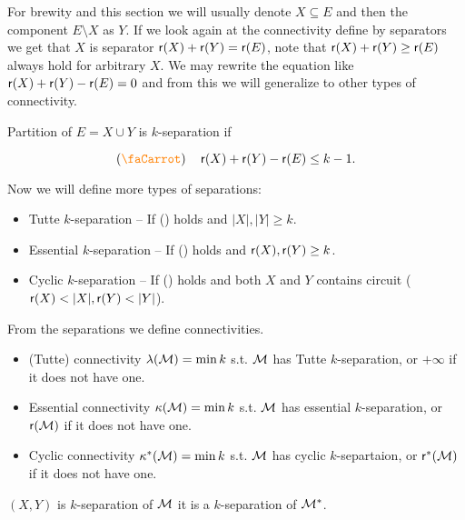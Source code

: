For brewity and this section we will usually denote $X \subseteq E$ and then the component $E \setminus X$ as $Y$. If we look again at the connectivity define by separators we get that $X$ is separator \ifft $\operatorname{\mathsf{r}}(X) + \operatorname{\mathsf{r}}(Y) = \operatorname{\mathsf{r}}(E)$, note that $\operatorname{\mathsf{r}}(X) + \operatorname{\mathsf{r}}(Y) \geq \operatorname{\mathsf{r}}(E)$ always hold for arbitrary $X$. We may rewrite the equation like $\operatorname{\mathsf{r}}(X) + \operatorname{\mathsf{r}}(Y) - \operatorname{\mathsf{r}}(E) = 0$ and from this we will generalize to other types of connectivity.

\begin{defn}
	Partition of $E = X \cup Y$ is $k$-separation if

	$$
	\text{(\textcolor{orange}{\faCarrot})} \quad \rank(X) + \rank(Y) - \rank(E) \leq k-1.
	$$
\end{defn}

\begin{defn}
	Now we will define more types of separations:

	\begin{itemize}
		\item Tutte $k$-separation -- If (\textcolor{orange}{\faCarrot}) holds and $|X|,|Y| \geq k$.
		\item Essential $k$-separation -- If (\textcolor{orange}{\faCarrot}) holds and $\operatorname{\mathsf{r}}(X), \operatorname{\mathsf{r}}(Y) \geq k$.
		\item Cyclic $k$-separation -- If (\textcolor{orange}{\faCarrot}) holds and both $X$ and $Y$ contains circuit ($\operatorname{\mathsf{r}}(X) < |X|, \operatorname{\mathsf{r}}(Y) < |Y|$).
	\end{itemize}
\end{defn}

\begin{defn}
	From the separations we define connectivities.

	\begin{itemize}
		\item (Tutte) connectivity $\lambda(\mathcal{M}) = \min k$ s.t. $\mathcal{M}$ has Tutte $k$-separation, or $+\infty$ if it does not have one.
		\item Essential connectivity $\kappa(\mathcal{M}) = \min k$ s.t. $\mathcal{M}$ has essential $k$-separation, or $\operatorname{\mathsf{r}}(\mathcal{M})$ if it does not have one.
		\item Cyclic connectivity $\kappa^{\ast}(\mathcal{M}) = \min k$ s.t. $\mathcal{M}$ has cyclic $k$-separtaion, or $\operatorname{\mathsf{r}}^{\ast}(\mathcal{M})$ if it does not have one.
	\end{itemize}
\end{defn}

\begin{lemma}
	$(X,Y)$ is $k$-separation of $\mathcal{M}$ \ifft it is a $k$-separation of $\mathcal{M}^{\ast}$.
\end{lemma}

